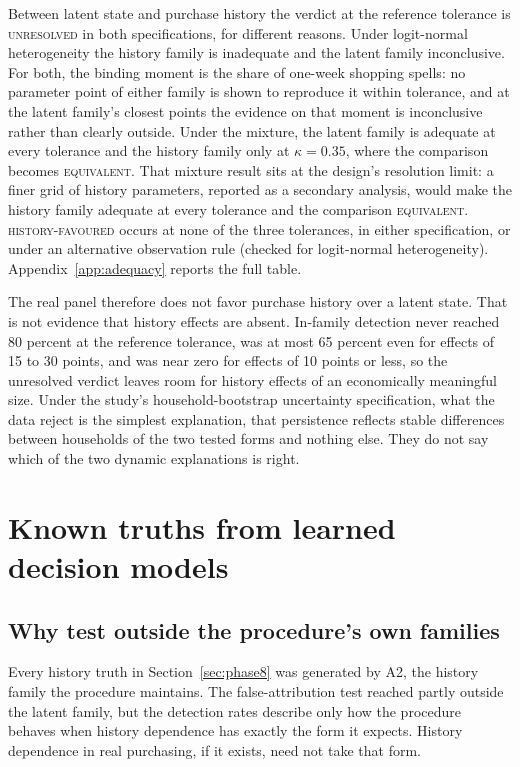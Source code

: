 \documentclass[11pt]{article}
\newcommand{\verdict}[1]{\textsc{#1}}
\begin{document}
Between latent state and purchase history the verdict at the reference tolerance is
\verdict{unresolved} in both specifications, for different reasons. Under logit-normal
heterogeneity the history family is inadequate and the latent family inconclusive. For both,
the binding moment is the share of one-week shopping spells: no parameter point of either
family is shown to reproduce it within tolerance, and at the latent family's closest points
the evidence on that moment is inconclusive rather than clearly outside. Under the mixture,
the latent family is adequate at every tolerance and the history family only at
$\kappa=0.35$, where the comparison becomes \verdict{equivalent}. That mixture result sits at
the design's resolution limit: a finer grid of history parameters, reported as a secondary
analysis, would make the history family adequate at every tolerance and the comparison
\verdict{equivalent}.
\verdict{history-favoured} occurs at none of the three tolerances, in either specification,
or under an alternative observation rule (checked for logit-normal heterogeneity).
Appendix~\ref{app:adequacy} reports the full table.

The real panel therefore does not favor purchase history over a latent state. That is not
evidence that history effects are absent. In-family detection never reached 80 percent at the
reference tolerance, was at most 65 percent even for effects of 15 to 30 points, and was
near zero for effects of 10 points or less, so the unresolved verdict leaves room for history
effects of an economically meaningful size. Under the study's household-bootstrap uncertainty
specification, what the data reject is the simplest explanation,
that persistence reflects stable differences between households of the two tested forms and
nothing else. They do not say which of the two dynamic explanations is right.

\section{Known truths from learned decision models}
\label{sec:learned}

\subsection{Why test outside the procedure's own families}

Every history truth in Section~\ref{sec:phase8} was generated by A2, the history family the
procedure maintains. The false-attribution test reached partly outside the latent family, but
the detection rates describe only how the procedure behaves when history dependence has
exactly the form it expects. History dependence in real purchasing, if it exists, need not
take that form.
\end{document}
